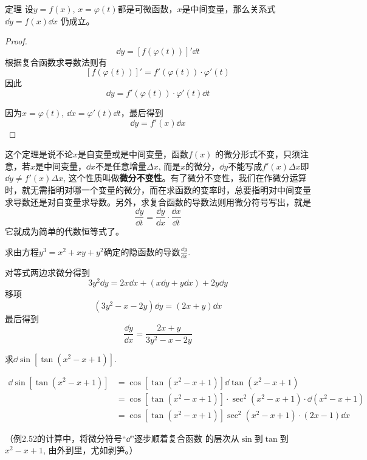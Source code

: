\begin{blk}
    {定理} 设$y=f(x)$, $x=\varphi (t)$都是可微函数，$x$是中间变量，那么关系式
$\dd y=f (x) \dd x$
仍成立。
\end{blk}

\begin{proof}
   \[ \dd y=[f(\varphi (t))]'\dd t\]
根据复合函数求导数法则有
\[[f (\varphi  (t) ) ] '=f' (\varphi  (t) ) \cdot \varphi ' (t)\]
因此
\[\dd y=f' (\varphi  (t) ) \cdot \varphi' (t) \dd t\]

因为$x=\varphi  (t)$, $\dd x=\varphi ' (t) \dd t$，最后得到
\[\dd y=f' (x) \dd x\]
\end{proof}

这个定理是说不论$x$是自变量或是中间变量，函数$f(x)$
的微分形式不变，只须注意，若$x$是中间变量，$\dd x$不是任意增量$\Delta x$, 而是$x$的微分，$\dd y$不能写成$f'(x)\Delta x$即$\dd y\ne f'(x)\Delta x$, 这个性质叫做\textbf{微分不变性}。有了微分不变性，我们在作微分运算时，就无需指明对哪一个变量的微分，而在求函数的变率时，总要指明对中间变量求导数还是对自变量求导数。另外，求复合函数的导数法则用微分符号写出，就是
\[\frac{\dd y}{\dd t}=\frac{\dd y}{\dd x}\cdot \frac{\dd x}{\dd t}\]
它就成为简单的代数恒等式了。

\begin{example}
    求由方程$y^3=x^2+xy+y^2$确定的隐函数的导数$\frac{\dd y}{\dd x}$.
\end{example}

\begin{solution}
    对等式两边求微分得到
\[3y^2\dd y=2x\dd x+ (x\dd y+y\dd x) +2y\dd y\]
移项
\[(3y^2-x-2y)\dd y=(2x+y)\dd x\]
最后得到
\[\frac{\dd y}{\dd x}=\frac{2x+y}{3y^2-x-2y}\]
\end{solution}

\begin{example}
    求$\dd\sin [\tan(x^2-x+1)]$.
\end{example}


\begin{solution}
\[\begin{split}
    \dd\sin \left[\tan(x^2-x+1)\right]&=\cos\left[\tan(x^2-x+1)\right]\dd \tan(x^2-x+1)\\
    &=\cos\left[\tan(x^2-x+1)\right]\cdot \sec^2 (x^2-x+1)\cdot \dd (x^2-x+1)\\
    &=\cos\left[\tan(x^2-x+1)\right]\sec^2(x^2-x+1)\cdot (2x-1)\dd x 
\end{split}\]
\end{solution}
（例2.52的计算中，将微分符号“$\dd$”逐步顺着复合函数
的层次从$\sin$到$\tan$到$x^2-x+1$, 由外到里，尤如剥笋。）

